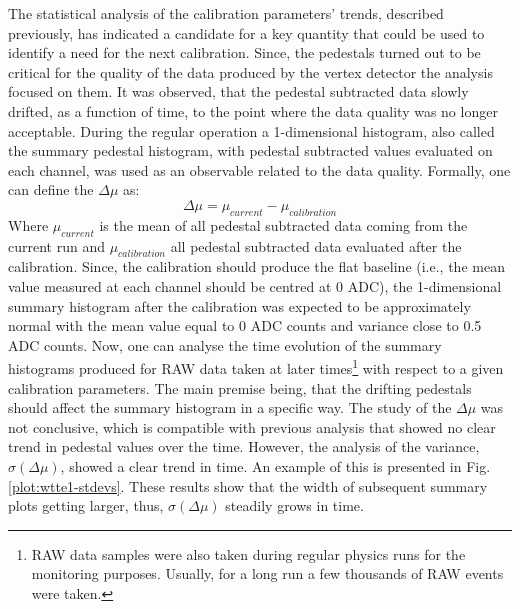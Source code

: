 The statistical analysis of the calibration parameters' trends, described previously, has indicated a candidate for a key quantity that could be used to identify a need for the next calibration. Since, the pedestals turned out to be critical for the quality of the data produced by the vertex detector the analysis focused on them. It was observed, that the pedestal subtracted data slowly drifted, as a function of time, to the point where the data quality was no longer acceptable. During the regular operation a 1-dimensional histogram, also called the summary pedestal histogram, with pedestal subtracted values evaluated on each channel, was used as an observable related to the data quality. Formally, one can define the $\Delta\mu$ as:
\begin{equation}
    \Delta\mu = \mu_{current} - \mu_{calibration}
\end{equation}
Where $\mu_{current}$ is the mean of all pedestal subtracted data coming from the current run and $\mu_{calibration}$ all pedestal subtracted data evaluated after the calibration. Since, the calibration should produce the flat baseline (i.e., the mean value measured at each channel should be centred at 0 ADC), the 1-dimensional summary histogram after the calibration was expected to be approximately normal with the mean value equal to 0 ADC counts and variance close to 0.5 ADC counts. Now, one can analyse the time evolution of the summary histograms produced for RAW data taken at later times\footnote{RAW data samples were also taken during regular physics runs for the monitoring purposes. Usually, for a long run a few thousands of RAW events were taken.} with respect to a given calibration parameters. The main premise being, that the drifting pedestals should affect the summary histogram in a specific way. The study of the $\Delta\mu$ was not conclusive, which is compatible with previous analysis that showed no clear trend in pedestal values over the time.
However, the analysis of the variance, $\sigma(\Delta\mu)$, showed a clear trend in time. An example of this is presented in Fig.
\ref{plot:wtte1-stdevs}. These results show that the width of subsequent summary plots getting larger, thus, $\sigma(\Delta\mu)$ steadily grows in time.

